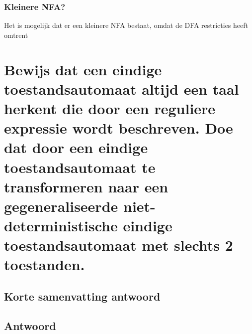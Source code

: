 \documentclass{article}
\begin{document}
        \subsubsection{Kleinere NFA?}
            Het is mogelijk dat er een kleinere NFA bestaat, omdat de DFA restricties heeft omtrent

\newpage
\section{Bewijs dat een eindige toestandsautomaat altijd een taal herkent die door een reguliere expressie wordt beschreven. Doe dat door een eindige toestandsautomaat te transformeren naar een gegeneraliseerde niet-deterministische eindige toestandsautomaat met slechts 2 toestanden.}
    \subsection{Korte samenvatting antwoord}

    \subsection{Antwoord}
\end{document}
